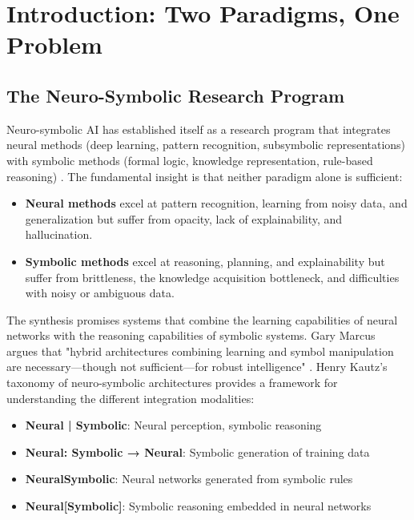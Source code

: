 \documentclass[12pt,a4paper]{article}
\begin{document}
\newpage
\tableofcontents
\newpage


\section{Introduction: Two Paradigms, One Problem}

\subsection{The Neuro-Symbolic Research Program}

Neuro-symbolic AI has established itself as a research program that integrates 
neural methods (deep learning, pattern recognition, subsymbolic representations) 
with symbolic methods (formal logic, knowledge representation, rule-based reasoning) 
\citep{hitzler2022neuro, garcez2020neurosymbolic}. The fundamental insight is 
that neither paradigm alone is sufficient:

\begin{itemize}
    \item \textbf{Neural methods} excel at pattern recognition, learning from 
    noisy data, and generalization but suffer from opacity, lack of explainability, 
    and hallucination.
    \item \textbf{Symbolic methods} excel at reasoning, planning, and 
    explainability but suffer from brittleness, the knowledge acquisition 
    bottleneck, and difficulties with noisy or ambiguous data.
\end{itemize}

The synthesis promises systems that combine the learning capabilities of neural 
networks with the reasoning capabilities of symbolic systems. Gary Marcus 
argues that "hybrid architectures combining learning and symbol manipulation 
are necessary—though not sufficient—for robust intelligence" \citep{marcus2020next}. 
Henry Kautz's taxonomy of neuro-symbolic architectures \citep{kautz2020third} 
provides a framework for understanding the different integration modalities:

\begin{itemize}
    \item \textbf{Neural | Symbolic}: Neural perception, symbolic reasoning
    \item \textbf{Neural: Symbolic → Neural}: Symbolic generation of training data
    \item \textbf{NeuralSymbolic}: Neural networks generated from symbolic rules
    \item \textbf{Neural[Symbolic]}: Symbolic reasoning embedded in neural networks
\end{itemize}
\end{document}
